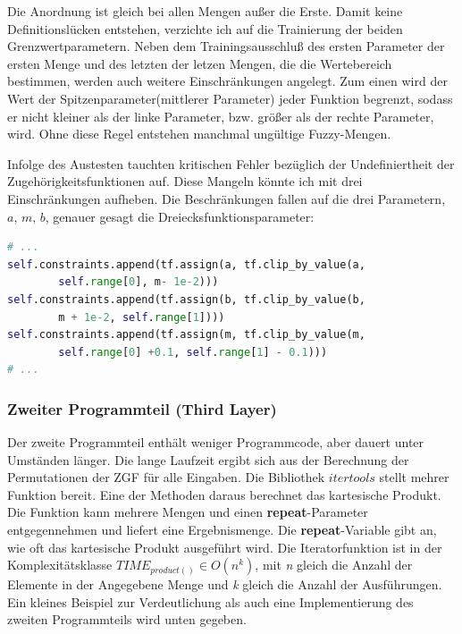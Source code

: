 Die Anordnung ist gleich bei allen Mengen außer die Erste. Damit keine
Definitionslücken entstehen, verzichte ich auf die Trainierung der
beiden Grenzwertparametern. Neben dem Trainingsausschluß des ersten
Parameter der ersten Menge und des letzten der letzen Mengen, die die
Wertebereich bestimmen, werden auch weitere Einschränkungen angelegt.
Zum einen wird der Wert der Spitzenparameter(mittlerer Parameter) jeder
Funktion begrenzt, sodass er nicht kleiner als der linke Parameter, bzw.
größer als der rechte Parameter, wird. Ohne diese Regel entstehen
manchmal ungültige Fuzzy-Mengen.

Infolge des Austesten tauchten kritischen Fehler bezüglich der
Undefiniertheit der Zugehörigkeitsfunktionen auf. Diese Mangeln könnte
ich mit drei Einschränkungen aufheben. Die Beschränkungen fallen auf die
drei Parametern, \(\textit{a, m, b}\), genauer gesagt die
Dreiecksfunktionsparameter:

\begin{lstlisting}[language=Python]
# ...
self.constraints.append(tf.assign(a, tf.clip_by_value(a, 
		self.range[0], m- 1e-2)))
self.constraints.append(tf.assign(b, tf.clip_by_value(b, 
		m + 1e-2, self.range[1])))
self.constraints.append(tf.assign(m, tf.clip_by_value(m, 
		self.range[0] +0.1, self.range[1] - 0.1)))
# ...
\end{lstlisting}

\subsubsection{Zweiter Programmteil (Third Layer)}\label{zweiter-programmteil-third-layer}

Der zweite Programmteil enthält weniger Programmcode, aber dauert unter
Umständen länger. Die lange Laufzeit ergibt sich aus der Berechnung der
Permutationen der ZGF für alle Eingaben. Die Bibliothek
\(\textit{itertools}\) stellt mehrer Funktion bereit. Eine der Methoden
daraus berechnet das kartesische Produkt. Die Funktion kann mehrere
Mengen und einen \textbf{repeat}-Parameter entgegennehmen und liefert
eine Ergebnismenge. Die \textbf{repeat}-Variable gibt an, wie oft das
kartesische Produkt ausgeführt wird. Die Iteratorfunktion ist in der
Komplexitätsklasse \(TIME_{product()} \in O(n^k)\), mit \emph{n} gleich
die Anzahl der Elemente in der Angegebene Menge und \emph{k} gleich die
Anzahl der Ausführungen. Ein kleines Beispiel zur Verdeutlichung als
auch eine Implementierung des zweiten Programmteils wird unten gegeben.

